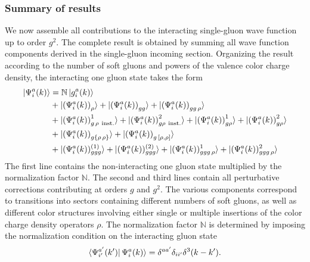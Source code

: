 \documentclass[a4paper,11pt]{article}
\def\mf#1{\mathbb{#1}}
\begin{document}
\subsubsection{Summary of results}\label{sec:norm}
We now assemble all contributions to the interacting single-gluon wave function up to order $g^{2}$. The complete result is obtained by summing all wave function components derived in the single-gluon incoming section. Organizing the result according to the number of soft gluons and powers of the valence color charge density, the interacting one gluon state takes the form
\begin{align}
 \notag 
  \ket{\Psi^{a}_{i}(k)}
 & = \mf{N} \ket{ g_i^a(k) }
 \\ \notag & + 
 \ket{ \left(\Psi^{a}_{i}(k) \right)_{\rho} }
+\ket{ \left(\Psi^{a}_{i}(k) \right)_{gg} }
+\ket{ \left(\Psi^{a}_{i}(k) \right)_{gg\,\rho} }
\\ & +\ket{ \left(\Psi^{a}_{i}(k) \right)^{1}_{g\, \rho\ {\rm inst.} } }
+\ket{ \left(\Psi^{a}_{i}(k) \right)^{2}_{g \rho\ {\rm inst.} } }
+\ket{ \left(\Psi^{a}_{i}(k) \right)^{1}_{g \rho} }
+\ket{ \left(\Psi^{a}_{i}(k) \right)^{2}_{g \rho} }
\notag \\ & +\ket{ \left(\Psi^{a}_{i}(k) \right)_{g \{\rho\, \rho\}} }
+\ket{  \left(\Psi^{a}_{i}(k) \right)_{g\, [\rho ,\rho]}}\notag \\ &   +\ket{(\Psi^{a}_{i}(k))^{(1)}_{ggg}}+\ket{(\Psi^{a}_{i}(k))^{(2)}_{ggg}}+\ket{(\Psi^{a}_{i}(k))^{1}_{ggg\,\rho}}+\ket{(\Psi^{a}_{i}(k))^{2}_{ggg\,\rho}}
\label{Eq:intergluon}
\end{align}
The first line contains the non-interacting one gluon state multiplied by the normalization factor $\mf{N}$. The second and third lines contain all perturbative corrections contributing at orders $g$ and $g^{2}$. The various components correspond to transitions into sectors containing different numbers of soft gluons, as well as different color structures involving either single or multiple insertions of the color charge density operators $\rho$. The normalization factor $\mf{N}$ is determined by imposing the normalization condition on the interacting gluon state
\begin{align}
  \bra{\Psi^{a'}_{i'}(k')}
  {\Psi^{a}_{i}(k)} \rangle
  = \delta^{a a'} \delta_{i i'} \delta^{3}(k-k'). 
\end{align}
\end{document}

